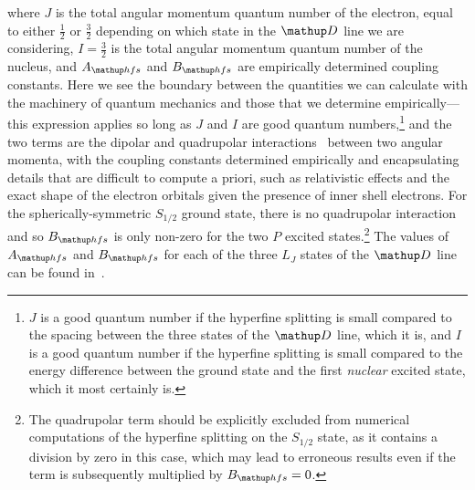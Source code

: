 where $J$ is the total angular momentum quantum number of the electron, equal to either $\frac12$ or $\frac32$ depending on which state in the $\up{D}$ line we are considering, $I=\frac32$ is the total angular momentum quantum number of the nucleus, and $A_\up{hfs}$ and $B_\up{hfs}$ are empirically determined coupling constants. Here we see the boundary between the quantities we can calculate with the machinery of quantum mechanics and those that we determine empirically---this expression applies so long as $J$ and $I$ are good quantum numbers,\footnote{$J$ is a good quantum number if the hyperfine splitting is small compared to the spacing between the three states of the $\up{D}$ line, which it is, and $I$ is a good quantum number if the hyperfine splitting is small compared to the energy difference between the ground state and the first \emph{nuclear} excited state, which it most certainly is.} and the two terms are the dipolar and quadrupolar interactions~\cite{arimondo_experimental_1977} between two angular momenta, with the coupling constants determined empirically and encapsulating details that are difficult to compute a priori, such as relativistic effects and the exact shape of the electron orbitals given the presence of inner shell electrons. For the spherically-symmetric $S_{1/2}$ ground state, there is no quadrupolar interaction and so $B_\up{hfs}$ is only non-zero for the two $P$ excited states.\footnote{The quadrupolar term should be explicitly excluded from numerical computations of the hyperfine splitting on the $S_{1/2}$ state, as it contains a division by zero in this case, which may lead to erroneous results even if the term is subsequently multiplied by $B_\up{hfs}=0$.} The values of $A_\up{hfs}$ and $B_\up{hfs}$ for each of the three $L_J$ states of the $\up{D}$ line can be found in~\cite{steck_rubidium_2015}.

